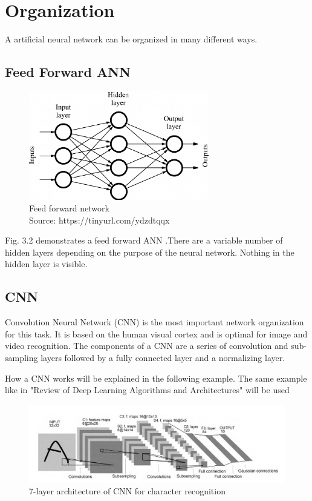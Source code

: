 \section{Organization}

A artificial neural network can be organized in many different ways.

\subsection{Feed Forward ANN}

\begin{figure}[h]
	\centering
	\includegraphics[width=0.7\textwidth]{./media/images/feed_forward_neural_network.png}
  	\caption{Feed forward network
  	\\Source: https://tinyurl.com/ydzdtqqx}
  	\label{ffNN}
\end{figure}

Fig. 3.2 demonstrates a feed forward ANN .There are a variable number of hidden layers depending on the purpose of the neural network. Nothing in the hidden layer is visible. 

\subsection{CNN}

Convolution Neural Network (CNN) is the most important network organization for this task. It is based on the human visual cortex and is optimal for image and video recognition. The components of a CNN are a series of convolution and sub-sampling layers followed by a fully connected layer and a normalizing layer.

How a CNN works will be explained in the following example. The same example like in "Review of Deep Learning Algorithms and Architectures"\cite{exampleCNN} will be used
\begin{figure}[h]
	\centering
	\includegraphics[width=1.1\textwidth]{./media/images/CNN.PNG}
  	\caption{7-layer architecture of CNN for character recognition
  	\\ \cite[Fig.~4.]{exampleCNN}}
  	\label{CNN}
\end{figure}

